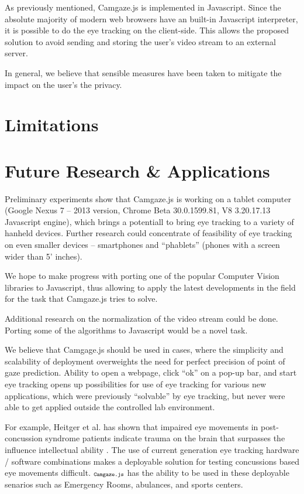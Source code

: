 \documentclass[annual]{acmsiggraph}
\newcommand{\Acronym}[1]{\ensuremath{{\small{\texttt{#1}}}}}
\newcommand{\Name}{\Acronym{Camgaze.js}} \newcommand{\False}{\Constant{false}}
\newcommand{\Constant}[1]{\ensuremath{\small{\texttt{#1}}}}
\begin{document}
As previously mentioned, Camgaze.js is implemented in Javascript. Since the
absolute majority of modern web browsers have an built-in Javascript
interpreter, it is possible to do the eye tracking on the client-side. This
allows the proposed solution to avoid sending and storing the user’s video
stream to an external server.

In general, we believe that sensible measures have been taken to mitigate the
impact on the user’s the privacy.

\section{Limitations}

\section{Future Research \& Applications}

Preliminary experiments show that Camgaze.js is working on a tablet computer
(Google Nexus 7 -- 2013 version, Chrome Beta 30.0.1599.81, V8 3.20.17.13
Javascript engine), which brings a potentiall to bring eye tracking to a
variety of hanheld devices. Further research could concentrate of feasibility
of eye tracking on even smaller devices -- smartphones and “phablets” (phones
with a screen wider than 5’ inches).

We hope to make progress with porting one of the popular Computer Vision
libraries to Javascript, thus allowing to apply the latest developments in the
field for the task that Camgaze.js tries to solve.

Additional research on the normalization of the video stream could be done.
Porting some of the algorithms to Javascript would be a novel task. 

We believe that Camgage.js should be used in cases, where the simplicity and
scalability of deployment overweights the need for perfect precision of point
of gaze prediction. Ability to open a webpage, click “ok” on a pop-up bar, and
start eye tracking opens up possibilities for use of eye tracking for various
new applications, which were previously “solvable” by eye tracking, but never
were able to get applied outside the controlled lab environment.

For example, Heitger et al. has shown that impaired eye movements in
post-concussion syndrome patients indicate trauma on the brain that surpasses
the influence intellectual ability \cite{Heitger2009}. The use of current
generation eye tracking hardware / software combinations makes a deployable
solution for testing concussions based eye movements difficult. $\Name$ has the
ability to be used in these deployable senarios such as Emergency Rooms,
abulances, and sports centers.



\end{document}
